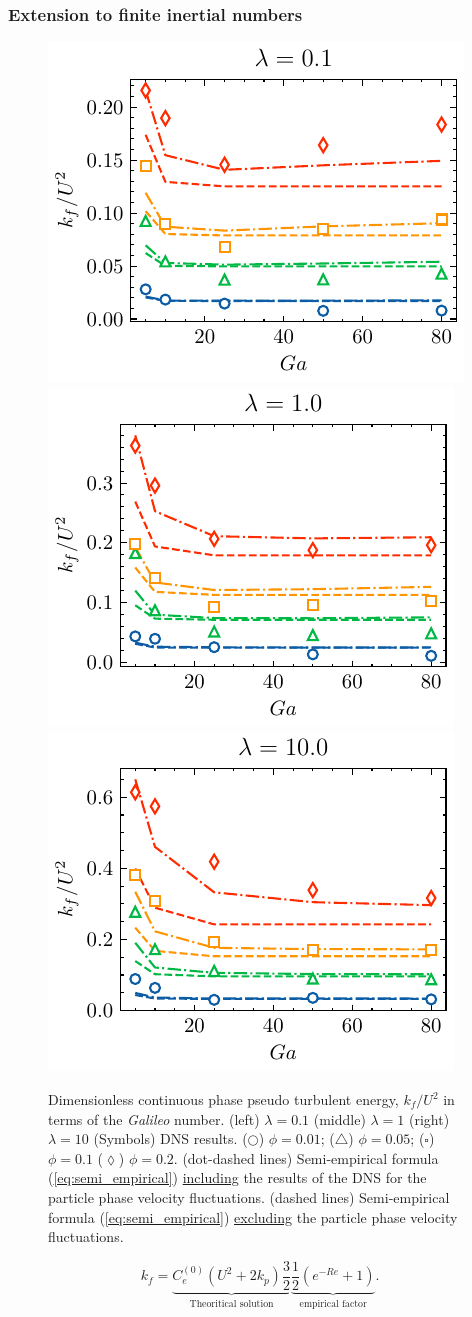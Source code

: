\documentclass{sintefbeamer}
\begin{document}
\begin{frame}
  \frametitle{Extension to finite inertial numbers}
  \begin{figure}
    \centering
    \includegraphics[height = 0.25\textwidth]{image/HOMOGENEOUS_final/CA/KF2_l_0.pdf}
    \includegraphics[height = 0.25\textwidth]{image/HOMOGENEOUS_final/CA/KF2_l_1.pdf}
    \includegraphics[height = 0.25\textwidth]{image/HOMOGENEOUS_final/CA/KF2_l_10.pdf}
    \caption{\footnotesize
      Dimensionless continuous phase pseudo turbulent energy, $k_f/U^2$ in terms of the \textit{Galileo} number.
    (left) $\lambda = 0.1$
    (middle) $\lambda = 1$
    (right) $\lambda = 10$
    (Symbols) DNS results. 
    ($\pmb\bigcirc$) $\phi = 0.01$; ($\pmb\triangle$) $ \phi = 0.05$; ($\pmb\square$) $\phi = 0.1$ ($\pmb\lozenge$) $\phi = 0.2$.
    (dot-dashed lines) Semi-empirical formula (\ref{eq:semi_empirical}) \underline{including} the results of the DNS for the particle phase velocity fluctuations. 
    (dashed lines) Semi-empirical formula (\ref{eq:semi_empirical}) \underline{excluding} the particle phase velocity fluctuations. 
    }
    \label{fig:kf}
\end{figure}
\begin{equation}
  k_f
  = 
  \underbrace{C_e^{(0)}  \left( U^2 + 2 k_p\right)  \frac{3}{2}}_\text{Theoritical solution}
  \underbrace{\frac{1}{2}\left(e^{-Re} +1\right)}_{\text{empirical factor}}.
  \label{eq:semi_empirical}
\end{equation}

\end{frame}
\end{document}
